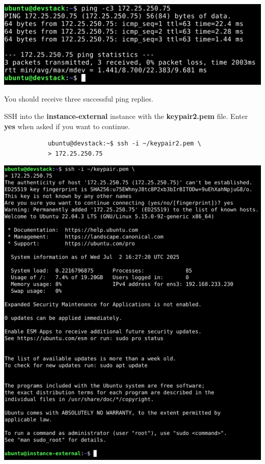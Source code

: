\documentclass[letterpaper, 12pt]{article}
\begin{document}
\begin{enumerate}
\begin{labstep}
        \begin{center}
            \includegraphics[width=\linewidth]{images/part9/step40.png}
        \end{center}
    \end{labstep}

    \begin{notebox}
        You should receive three successful ping replies.
    \end{notebox}

    \begin{labstep}
        SSH into the \textbf{instance-external} instance with the \textbf{keypair2.pem} file.
        Enter \textbf{yes} when asked if you want to continue.
        \begin{lstlisting}
            ubuntu@devstack:~$ ssh -i ~/keypair2.pem \
            > 172.25.250.75
        \end{lstlisting}

        \begin{center}
            \includegraphics[width=\linewidth]{images/part9/step41.png}
        \end{center}
    \end{labstep}


\end{enumerate}
\end{document}
